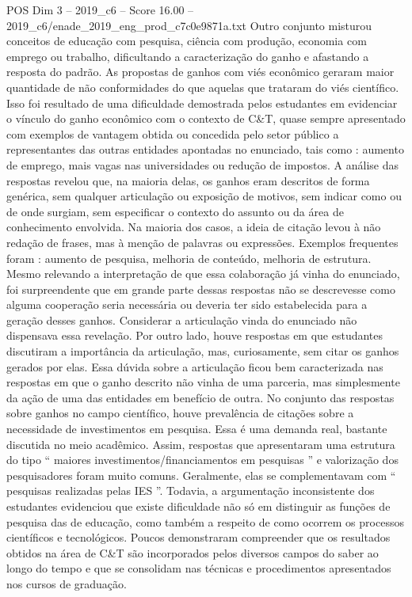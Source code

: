 \begin{textsample}{POS Dim 3 – 2019\_c6 – Score 16.00 – 2019\_c6/enade\_2019\_eng\_prod\_c7c0e9871a.txt}
Outro conjunto misturou conceitos de educação com pesquisa, ciência com produção, economia com emprego ou trabalho, dificultando a caracterização do ganho e afastando a resposta do padrão.
As propostas de ganhos com viés econômico geraram maior quantidade de não conformidades do que aquelas que trataram do viés científico.
Isso foi resultado de uma dificuldade demostrada pelos estudantes em evidenciar o vínculo do ganho econômico com o contexto de C\&T, quase sempre apresentado com exemplos de vantagem obtida ou concedida pelo setor público a representantes das outras entidades apontadas no enunciado, tais como : aumento de emprego, mais vagas nas universidades ou redução de impostos.
A análise das respostas revelou que, na maioria delas, os ganhos eram descritos de forma genérica, sem qualquer articulação ou exposição de motivos, sem indicar como ou de onde surgiam, sem especificar o contexto do assunto ou da área de conhecimento envolvida.
Na maioria dos casos, a ideia de citação levou à não redação de frases, mas à menção de palavras ou expressões.
Exemplos frequentes foram : aumento de pesquisa, melhoria de conteúdo, melhoria de estrutura.
Mesmo relevando a interpretação de que essa colaboração já vinha do enunciado, foi surpreendente que em grande parte dessas respostas não se descrevesse como alguma cooperação seria necessária ou deveria ter sido estabelecida para a geração desses ganhos.
Considerar a articulação vinda do enunciado não dispensava essa revelação.
Por outro lado, houve respostas em que estudantes discutiram a importância da articulação, mas, curiosamente, sem citar os ganhos gerados por elas.
Essa dúvida sobre a articulação ficou bem caracterizada nas respostas em que o ganho descrito não vinha de uma parceria, mas simplesmente da ação de uma das entidades em benefício de outra.
No conjunto das respostas sobre ganhos no campo científico, houve prevalência de citações sobre a necessidade de investimentos em pesquisa.
Essa é uma demanda real, bastante discutida no meio acadêmico.
Assim, respostas que apresentaram uma estrutura do tipo “ maiores investimentos/financiamentos em pesquisas ” e valorização dos pesquisadores foram muito comuns.
Geralmente, elas se complementavam com “ pesquisas realizadas pelas IES ”.
Todavia, a argumentação inconsistente dos estudantes evidenciou que existe dificuldade não só em distinguir as funções de pesquisa das de educação, como também a respeito de como ocorrem os processos científicos e tecnológicos.
Poucos demonstraram compreender que os resultados obtidos na área de C\&T são incorporados pelos diversos campos do saber ao longo do tempo e que se consolidam nas técnicas e procedimentos apresentados nos cursos de graduação.

\end{textsample}
